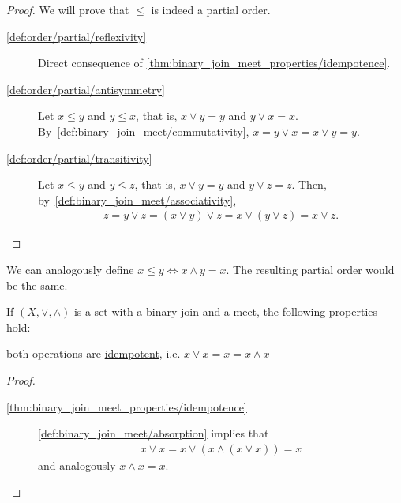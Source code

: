 \begin{proof}
  We will prove that $\leq$ is indeed a partial order.
  \begin{description}
    \item[\ref{def:order/partial/reflexivity}] Direct consequence of \cref{thm:binary_join_meet_properties/idempotence}.
    \item[\ref{def:order/partial/antisymmetry}] Let $x \leq y$ and $y \leq x$, that is, $x \lor y = y$ and $y \lor x = x$. By~\ref{def:binary_join_meet/commutativity}, $x = y \lor x = x \lor y = y$.
    \item[\ref{def:order/partial/transitivity}] Let $x \leq y$ and $y \leq z$, that is, $x \lor y = y$ and $y \lor z = z$. Then, by~\ref{def:binary_join_meet/associativity},
    \begin{align*}
      z = y \lor z = (x \lor y) \lor z = x \lor (y \lor z) = x \lor z.
    \end{align*}
  \end{description}
\end{proof}

\begin{note}\label{note:binary_join_meet_order}
  We can analogously define $x \leq y \iff x \land y = x$. The resulting partial order would be the same.
\end{note}

\begin{proposition}\label{thm:binary_join_meet_properties}
  If $(X, \lor, \land)$ is a set with a binary join and a meet, the following properties hold:
  \begin{defenum}
    \item\label{thm:binary_join_meet_properties/idempotence} both operations are \uline{idempotent}, i.e. $x \lor x = x = x \land x$
  \end{defenum}
\end{proposition}
\begin{proof}
  \begin{description}
    \item[\ref{thm:binary_join_meet_properties/idempotence}] \ref{def:binary_join_meet/absorption} implies that
    \begin{align*}
      x \lor x = x \lor (x \land (x \lor x)) = x
    \end{align*}
    and analogously $x \land x = x$.
  \end{description}
\end{proof}

